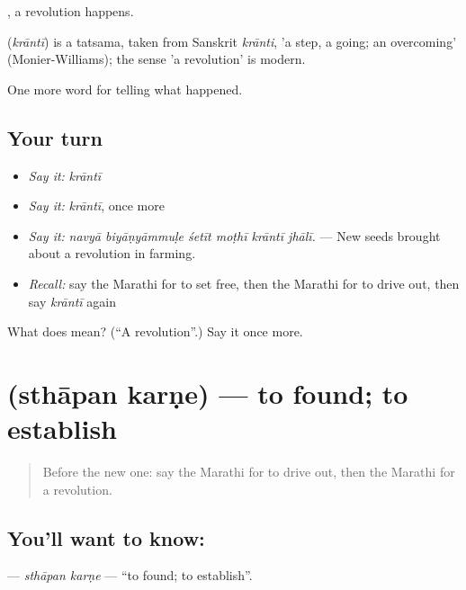  , a revolution happens.

\begin{cousinweb}
\textbf{} (\emph{krāntī}) is a tatsama, taken from Sanskrit \emph{krānti}, 'a step, a going; an overcoming' (Monier-Williams); the sense 'a revolution' is modern.
\end{cousinweb}

\begin{grammarlens}[title={What you've built}]
One more word for telling what happened.
\end{grammarlens}

\subsection*{Your turn}
\begin{itemize}
\raggedright
  \item \emph{Say it:} \emph{krāntī}
  \item \emph{Say it:} \emph{krāntī}, once more
  \item \emph{Say it:} \emph{navyā biyāṇyāmmuḷe śetīt moṭhī krāntī jhālī.} — New seeds brought about a revolution in farming.
  \item \emph{Recall:} say the Marathi for to set free, then the Marathi for to drive out, then say \emph{krāntī} again
\end{itemize}

\begin{tcolorbox}[breakable,colback=teal!4,colframe=teal!35!black,title={Before you move on}]
What does  mean? (\textquotedblleft{}A revolution\textquotedblright{}.) Say it once more.
\end{tcolorbox}
\section[\texorpdfstring{\mr{स्थापन} \mr{करणे} (sthāpan karṇe)}{स्थापन करणे (sthāpan karṇe)}]{  (sthāpan karṇe) — to found; to establish}

\label{lesson:MR-C334-sthapan-karne}



\begin{quote}
Before the new one: say the Marathi for to drive out, then the Marathi for a revolution.
\end{quote}

\subsection*{You'll want to know:  }
\textbf{ } — \emph{sthāpan karṇe} — \textquotedblleft{}to found; to establish\textquotedblright{}.

